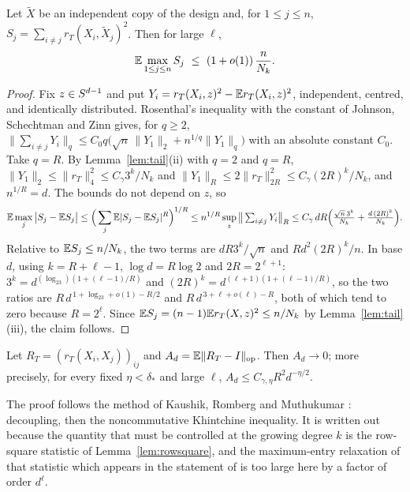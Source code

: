 \begin{lemma}\label{lem:rowsquare}
Let $\widetilde X$ be an independent copy of the design and, for $1\le j\le n$,
$S_j=\sum_{i\ne j}r_T(X_i,\widetilde X_j)^2$. Then for large $\ell$,
\[
\E\max_{1\le j\le n}S_j\ \le\ (1+o(1))\,\frac{n}{N_k}.
\]
\end{lemma}

\begin{proof}
Fix $z\in S^{d-1}$ and put $Y_i=r_T(X_i,z)^2-\mathbb{E} r_T(X_i,z)^2$, independent, centred, and identically distributed.
Rosenthal's inequality with the constant of Johnson, Schechtman and Zinn \cite{Rosenthal,JSZ} gives, for $q\ge2$,
$\|\sum_{i\ne j}Y_i\|_q\le C_0q\big(\sqrt n\,\|Y_1\|_2+n^{1/q}\|Y_1\|_q\big)$ with an absolute constant $C_0$.
Take $q=R$. By Lemma~\ref{lem:tail}(ii) with $q=2$ and $q=R$, $\|Y_1\|_2\le\|r_T\|_4^2\le C_\gamma3^k/N_k$ and
$\|Y_1\|_R\le2\|r_T\|_{2R}^2\le C_\gamma(2R)^k/N_k$, and $n^{1/R}=d$. The bounds do not depend on $z$, so
\[
\mathbb{E}\max_j\big|S_j-\mathbb{E} S_j\big|\le\Big(\sum_j\mathbb{E}|S_j-\mathbb{E} S_j|^R\Big)^{1/R}\le n^{1/R}\sup_z\big\|\textstyle\sum_{i\ne j}Y_i\big\|_R
\le C_\gamma\,dR\Big(\frac{\sqrt n\,3^k}{N_k}+\frac{d\,(2R)^k}{N_k}\Big).
\]
Relative to $\mathbb{E} S_j\le n/N_k$, the two terms are $dR3^k/\sqrt n$ and $Rd^2(2R)^k/n$. In base $d$, using
$k=R+\ell-1$, $\log d=R\log2$ and $2R=2^{\ell+1}$: $3^k=d^{(\log_23)(1+(\ell-1)/R)}$ and
$(2R)^k=d^{(\ell+1)(1+(\ell-1)/R)}$, so the two ratios are $R\,d^{\,1+\log_23+o(1)-R/2}$ and
$R\,d^{\,3+\ell+o(\ell)-R}$, both of which tend to zero because $R=2^\ell$. Since $\mathbb{E} S_j=(n-1)\mathbb{E} r_T(X,z)^2\le n/N_k$
by Lemma~\ref{lem:tail}(iii), the claim follows.
\end{proof}

\begin{proposition}\label{prop:isotropy}
Let $R_T=(r_T(X_i,X_j))_{ij}$ and $A_d=\mathbb{E}\|R_T-I\|_{\mathrm{op}}$. Then $A_d\to0$; more precisely, for every fixed
$\eta<\delta_*$ and large $\ell$, $A_d\le C_{\gamma,\eta}R^2d^{-\eta/2}$.
\end{proposition}

The proof follows the method of Kaushik, Romberg and Muthukumar \cite{KRM}: decoupling, then the
noncommutative Khintchine inequality. It is written out because the quantity that must be controlled at
the growing degree $k$ is the row-square statistic of Lemma~\ref{lem:rowsquare}, and the maximum-entry
relaxation of that statistic which appears in the statement of \cite[Theorem~1]{KRM} is too large here by a
factor of order $d^{\ell}$.

